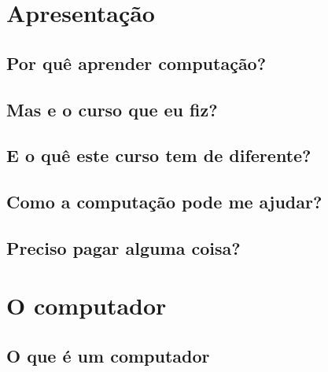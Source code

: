 %	

\color{black}

	\chapter[\large Apresentação]{Apresentação}

	
	
	
	
		
	
	\section[Por quê aprender computação?]{Por quê aprender computação?}
	
	
	\section[Mas e o curso que eu fiz?]{Mas e o curso que eu fiz?}
		
	
	\section[E o quê este curso tem de diferente?]{E o quê este curso tem de diferente?}

	
	\section[Como a computação pode me ajudar?]{Como a computação pode me ajudar?}

	
	\section[Preciso pagar alguma coisa?]{Preciso pagar alguma coisa?}


	\chapter[\large O computador]{O computador}
	
		\section[O que é um computador]{O que é um computador}
	
		
